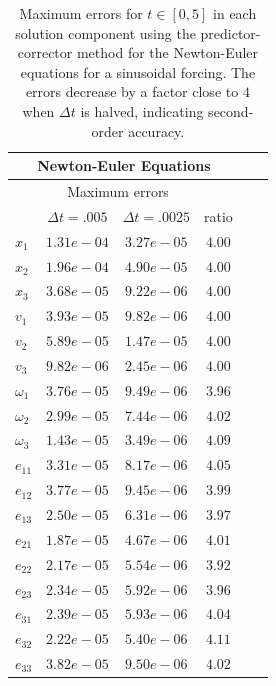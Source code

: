 \begin{table}[hbt]
\begin{center}
\begin{tabular}{|l|c|c|c|c|c|} \hline\hline 
   \multicolumn{4}{|c|}{Newton-Euler Equations} \\ \hline 
        & \multicolumn{2}{|c|}{Maximum errors}  &         \\ \hline 
        & $\Delta t=.005$ & $\Delta t=.0025$ & ratio   \\ \hline 
 $x_1$  & $1.31e-04$  & $3.27e-05$  & $4.00$ \\  
 $x_2$  & $1.96e-04$  & $4.90e-05$  & $4.00$ \\  
 $x_3$  & $3.68e-05$  & $9.22e-06$  & $4.00$ \\  
 $v_1$  & $3.93e-05$  & $9.82e-06$  & $4.00$ \\  
 $v_2$  & $5.89e-05$  & $1.47e-05$  & $4.00$ \\  
 $v_3$  & $9.82e-06$  & $2.45e-06$  & $4.00$ \\  
 $\omega_1$  & $3.76e-05$  & $9.49e-06$  & $3.96$ \\  
 $\omega_2$  & $2.99e-05$  & $7.44e-06$  & $4.02$ \\  
 $\omega_3$  & $1.43e-05$  & $3.49e-06$  & $4.09$ \\  
 $e_{11}$  & $3.31e-05$  & $8.17e-06$  & $4.05$ \\  
 $e_{12}$  & $3.77e-05$  & $9.45e-06$  & $3.99$ \\  
 $e_{13}$  & $2.50e-05$  & $6.31e-06$  & $3.97$ \\  
 $e_{21}$  & $1.87e-05$  & $4.67e-06$  & $4.01$ \\  
 $e_{22}$  & $2.17e-05$  & $5.54e-06$  & $3.92$ \\  
 $e_{23}$  & $2.34e-05$  & $5.92e-06$  & $3.96$ \\  
 $e_{31}$  & $2.39e-05$  & $5.93e-06$  & $4.04$ \\  
 $e_{32}$  & $2.22e-05$  & $5.40e-06$  & $4.11$ \\  
 $e_{33}$  & $3.82e-05$  & $9.50e-06$  & $4.02$ \\ 
\hline\hline 
\end{tabular}
\caption{Maximum errors for $t\in[0,5]$ in each solution component using the predictor-corrector method
    for the Newton-Euler equations for a sinusoidal forcing. The errors decrease by a factor
close to $4$ when $\Delta t$ is halved, indicating second-order accuracy.}\label{tab:generalErr}
\end{center}
\end{table}



